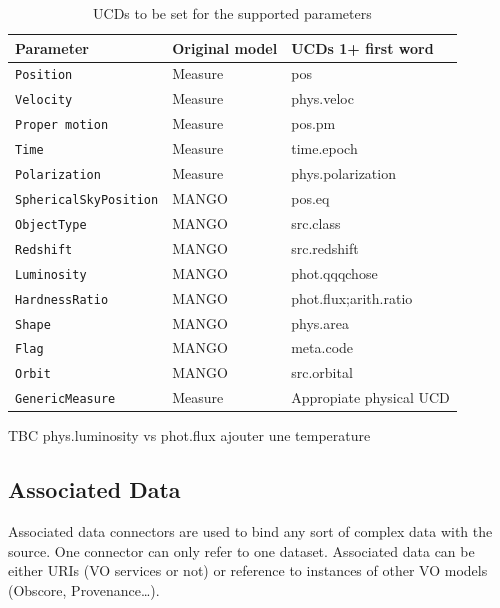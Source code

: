 \documentclass[11pt,a4paper]{ivoa}
\begin{document}
\begin{table}[ht!]
     \begin{tabular}{|p{4cm}|p{3cm}|p{3.5cm}|}
       \hline Parameter &  Original model & UCDs 1+ first word  \\
       \hline  \texttt{Position}             &  Measure  &  pos \\
       \hline  \texttt{Velocity  }            &  Measure & phys.veloc      \\
       \hline  \texttt{Proper motion}    & Measure & pos.pm    \\
       \hline  \texttt{Time}                   & Measure &  time.epoch   \\
       \hline  \texttt{Polarization}         & Measure & phys.polarization \\
       \hline  \texttt{SphericalSkyPosition}    &  MANGO  &  pos.eq \\
       \hline  \texttt{ObjectType}                   &  MANGO  & src.class \\
       \hline  \texttt{Redshift}                        &  MANGO  & src.redshift \\
       \hline  \texttt{Luminosity}                    &  MANGO  & phot.qqqchose \\
       \hline  \texttt{HardnessRatio}             &  MANGO  & phot.flux;arith.ratio \\
       \hline  \texttt{Shape}                     &  MANGO  & phys.area \\
       \hline  \texttt{Flag}                        &  MANGO  & meta.code  \\
       \hline  \texttt{Orbit}                       &  MANGO  & src.orbital \\
       \hline  \texttt{GenericMeasure}    &  Measure  &  Appropiate physical UCD \\
       \hline
     \end{tabular}
     \caption{ UCDs to be set for the supported parameters}
     \label{tab:ucds}
 \end{table}

TBC phys.luminosity  vs phot.flux
ajouter une temperature

\subsection{Associated Data}
Associated data connectors are used to bind any sort of complex data with the source. One connector can only refer to one dataset. Associated data can be either URIs (VO services or not) or reference to instances of other VO models (Obscore, Provenance…).
\end{document}
